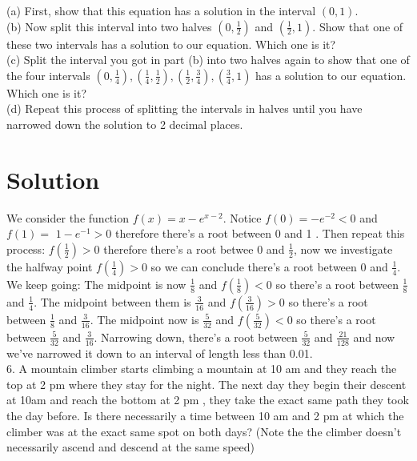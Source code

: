 \documentclass[10pt]{article}
\begin{document}
(a) First, show that this equation has a solution in the interval $(0,1)$.\\
(b) Now split this interval into two halves $\left(0, \frac{1}{2}\right)$ and $\left(\frac{1}{2}, 1\right)$. Show that one of these two intervals has a solution to our equation. Which one is it?\\
(c) Split the interval you got in part (b) into two halves again to show that one of the four intervals $\left(0, \frac{1}{4}\right),\left(\frac{1}{4}, \frac{1}{2}\right),\left(\frac{1}{2}, \frac{3}{4}\right),\left(\frac{3}{4}, 1\right)$ has a solution to our equation. Which one is it?\\
(d) Repeat this process of splitting the intervals in halves until you have narrowed down the solution to 2 decimal places.

\section*{Solution}
We consider the function $f(x)=x-e^{x-2}$. Notice $f(0)=-e^{-2}<0$ and $f(1)=$ $1-e^{-1}>0$ therefore there's a root between 0 and 1 . Then repeat this process: $f\left(\frac{1}{2}\right)>0$ therefore there's a root betwee 0 and $\frac{1}{2}$, now we investigate the halfway point $f\left(\frac{1}{4}\right)>0$ so we can conclude there's a root between 0 and $\frac{1}{4}$. We keep going: The midpoint is now $\frac{1}{8}$ and $f\left(\frac{1}{8}\right)<0$ so there's a root between $\frac{1}{8}$ and $\frac{1}{4}$. The midpoint between them is $\frac{3}{16}$ and $f\left(\frac{3}{16}\right)>0$ so there's a root between $\frac{1}{8}$ and $\frac{3}{16}$. The midpoint now is $\frac{5}{32}$ and $f\left(\frac{5}{32}\right)<0$ so there's a root between $\frac{5}{32}$ and $\frac{3}{16}$. Narrowing down, there's a root between $\frac{5}{32}$ and $\frac{21}{128}$ and now we've narrowed it down to an interval of length less than 0.01.\\
6. A mountain climber starts climbing a mountain at 10 am and they reach the top at 2 pm where they stay for the night. The next day they begin their descent at 10am and reach the bottom at 2 pm , they take the exact same path they took the day before. Is there necessarily a time between 10 am and 2 pm at which the climber was at the exact same spot on both days? (Note the the climber doesn't necessarily ascend and descend at the same speed)
\end{document}
